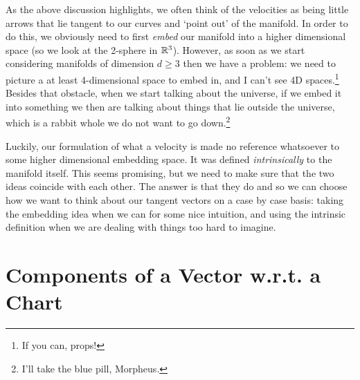 \br 
    As the above discussion highlights, we often think of the velocities as being little arrows that lie tangent to our curves and `point out' of the manifold. In order to do this, we obviously need to first \textit{embed} our manifold into a higher dimensional space (so we look at the 2-sphere in $\mathbb{R}^3$). However, as soon as we start considering manifolds of dimension $d\geq 3$ then we have a problem: we need to picture a at least 4-dimensional space to embed in, and I can't see 4D spaces.\footnote{If you can, props!} Besides that obstacle, when we start talking about the universe, if we embed it into something we then are talking about things that lie outside the universe, which is a rabbit whole we do not want to go down.\footnote{I'll take the blue pill, Morpheus.} 
    
    Luckily, our formulation of what a velocity is made no reference whatsoever to some higher dimensional embedding space. It was defined \textit{intrinsically} to the manifold itself. This seems promising, but we need to make sure that the two ideas coincide with each other. The answer is that they do and so we can choose how we want to think about our tangent vectors on a case by case basis: taking the embedding idea when we can for some nice intuition, and using the intrinsic definition when we are dealing with things too hard to imagine. 
\er 

\section{Components of a Vector w.r.t. a Chart}

